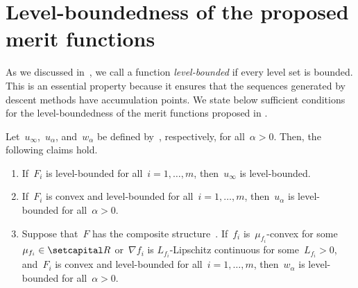 \documentclass[../main]{subfiles}
\begin{document}
\section{Level-boundedness of the proposed merit functions} 
As we discussed in~, we call a function \emph{level-bounded} if every level set is bounded.
This is an essential property because it ensures that the sequences generated by descent methods have accumulation points.
We state below sufficient conditions for the level-boundedness of the merit functions proposed in .
\begin{theorem} 
    Let~$u_\infty$,~$u_\alpha$, and~$w_\alpha$ be defined by~, respectively, for all~$\alpha > 0$.
    Then, the following claims hold.
    \begin{enumerate}
        \item If~$F_i$ is level-bounded for all~$i = 1, \dots, m$, then~$u_\infty$ is level-bounded. 
        \item If~$F_i$ is convex and level-bounded for all~$i = 1, \dots, m$, then~$u_\alpha$ is level-bounded for all~$\alpha > 0$. 
        \item Suppose that~$F$ has the composite structure~.
            If~$f_i$ is~$\mu_{f_i}$-convex for some~$\mu_{f_i} \in \setR$ or~$\nabla f_i$ is $L_{f_i}$-Lipschitz continuous for some~$L_{f_i} > 0$, and~$F_i$ is convex and level-bounded for all~$i = 1, \dots, m$, then~$w_\alpha$ is level-bounded for all~$\alpha > 0$. 
    \end{enumerate}
\end{theorem}
\end{document}
